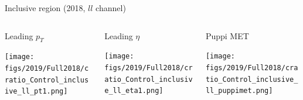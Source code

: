 \documentclass[9pt]{beamer}
\begin{document}
\begin{frame}{Inclusive region (2018, $ll$ channel)}
\justifying
\begin{columns}
		\hspace{5pt}
		\begin{column}{0.32\textwidth}
			\begin{center}
				\begin{block}{\centering Leading $p_T$}\end{block}	
     			\texttt{[image: figs/2019/Full2018/cratio\_Control\_inclusive\_ll\_pt1.png]}
    		\end{center}		
		\end{column} \hfill
		\begin{column}{0.32\textwidth}
			\begin{center}
				\begin{block}{\centering Leading $\eta$}\end{block}	
     			\texttt{[image: figs/2019/Full2018/cratio\_Control\_inclusive\_ll\_eta1.png]}
    		\end{center}		
		\end{column} \hfill
		\begin{column}{0.32\textwidth}
			\begin{center}
				\begin{block}{\centering Puppi MET}\end{block}	
     			\texttt{[image: figs/2019/Full2018/cratio\_Control\_inclusive\_ll\_puppimet.png]}
   			 \end{center}
		\end{column} \hfill
	\end{columns} \vspace{-5pt}
	\begin{columns}
		\hspace{5pt}

\end{columns}
\end{frame}
\end{document}
